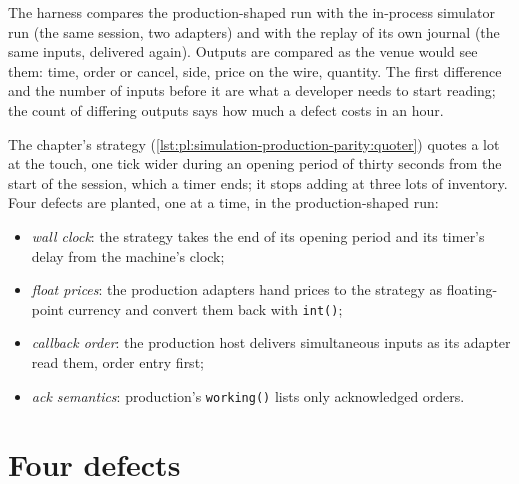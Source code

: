 The harness compares the production-shaped run with the in-process simulator run (the same session, two adapters) and with the replay of
its own journal (the same inputs, delivered again). Outputs are compared as the venue would see them: time, order or cancel, side, price on
the wire, quantity. The first difference and the number of inputs before it are what a developer needs to start reading; the count of
differing outputs says how much a defect costs in an hour.

\label{lst:pl:simulation-production-parity:compare}

The chapter's strategy (\cref{lst:pl:simulation-production-parity:quoter}) quotes a lot at the touch, one tick wider during an opening
period of thirty seconds from the start of the session, which a timer ends; it stops adding at three lots of inventory. Four defects are
planted, one at a time, in the production-shaped run:
\begin{itemize}
\item \emph{wall clock}: the strategy takes the end of its opening period and its timer's delay from the machine's clock;
\item \emph{float prices}: the production adapters hand prices to the strategy as floating-point currency and convert them back with
\texttt{int()};
\item \emph{callback order}: the production host delivers simultaneous inputs as its adapter read them, order entry first;
\item \emph{ack semantics}: production's \texttt{working()} lists only acknowledged orders.
\end{itemize}

\label{lst:pl:simulation-production-parity:quoter}

\section{Four defects}

